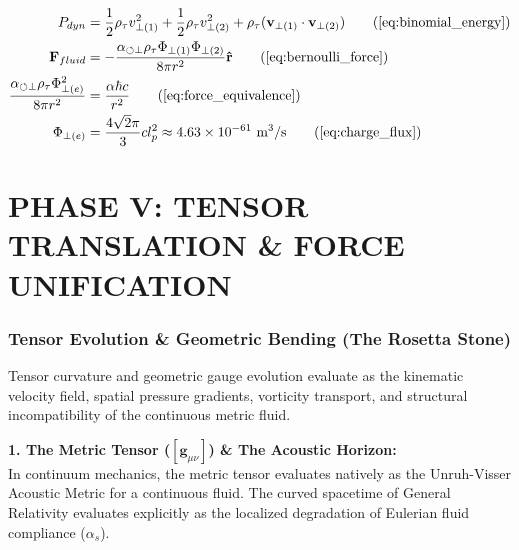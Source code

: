 \documentclass[11pt, a4paper]{article}
\begin{document}
\begin{tcolorbox}[recallbox, title={\ref{box:coulomb_bernoulli}. Coulomb's Law (Spherical Bernoulli \& Phase Flux)}]
\begin{align}
    P_{dyn} &= \frac{1}{2}\rho_{\tau} v_{\perp(1)}^2 + \frac{1}{2}\rho_{\tau} v_{\perp(2)}^2 + \rho_{\tau} (\mathbf{v}_{\perp(1)} \cdot \mathbf{v}_{\perp(2)}) \tag{\ref{eq:binomial_energy}} \\
    \mathbf{F}_{fluid} &= - \frac{\alpha_{\circlearrowleft \perp}\rho_{\tau} \Phi_{\perp(1)} \Phi_{\perp(2)}}{8\pi r^2} \mathbf{\hat{r}} \tag{\ref{eq:bernoulli_force}} \\
    \frac{\alpha_{\circlearrowleft \perp}\rho_{\tau} \Phi_{\perp(e)}^2}{8\pi r^2} &= \frac{\alpha \hbar c}{r^2} \tag{\ref{eq:force_equivalence}} \\
    \Phi_{\perp(e)} &= \frac{4\sqrt{2}\pi}{3}c \space l_p^2 \approx 4.63 \times 10^{-61} \text{ m}^3/\text{s} \tag{\ref{eq:charge_flux}}
\end{align}
\end{tcolorbox}



\part*{PHASE V: TENSOR TRANSLATION \& FORCE UNIFICATION}






\section{Tensor Evolution \& Geometric Bending (The Rosetta Stone)}
\label{sec:deriv_rosetta_stone}

Tensor curvature and geometric gauge evolution evaluate as the kinematic velocity field, spatial pressure gradients, vorticity transport, and structural incompatibility of the continuous metric fluid.

\textbf{1. The Metric Tensor ($[\boldsymbol{g}_{\mu\nu}]$) \& The Acoustic Horizon:} \\
In continuum mechanics, the metric tensor evaluates natively as the Unruh-Visser Acoustic Metric for a continuous fluid. The curved spacetime of General Relativity evaluates explicitly as the localized degradation of Eulerian fluid compliance ($\alpha_s$). 
\end{document}
